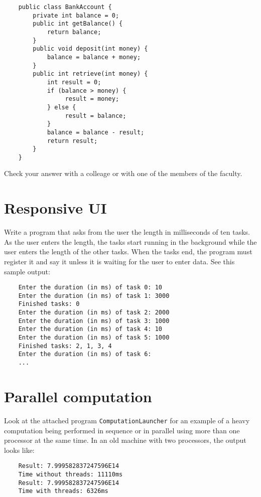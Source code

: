 \documentclass{article}
\begin{document}
\begin{verbatim}
    public class BankAccount {
        private int balance = 0;
        public int getBalance() {
            return balance;
        }
        public void deposit(int money) {
            balance = balance + money;
        }
        public int retrieve(int money) {
            int result = 0;
            if (balance > money) {
                 result = money;
            } else {
                 result = balance;
            }
            balance = balance - result;
            return result;
        }
    }
\end{verbatim}

Check your answer with a colleage or with one of the members of the
faculty. 

\section{Responsive UI}
\label{sec:responsive-ui}

Write a program that asks from the user the length in milliseconds of
ten tasks. As the user enters the length, the tasks start running in
the background while the user enters the length of the other
tasks. When the tasks end, the program must register it and say it
unless it is waiting for the user to enter data. See this sample
output: 

\begin{verbatim}
    Enter the duration (in ms) of task 0: 10
    Enter the duration (in ms) of task 1: 3000
    Finished tasks: 0
    Enter the duration (in ms) of task 2: 2000
    Enter the duration (in ms) of task 3: 1000
    Enter the duration (in ms) of task 4: 10
    Enter the duration (in ms) of task 5: 1000
    Finished tasks: 2, 1, 3, 4
    Enter the duration (in ms) of task 6: 
    ...
\end{verbatim}

\section{Parallel computation}
\label{sec:parallel-computation}

Look at the attached program \verb+ComputationLauncher+ for an example
of a heavy computation being performed in sequence or in parallel
using more than one processor at the same time. In an old machine with
two processors, the output looks like: 

\begin{verbatim}
    Result: 7.999582837247596E14
    Time without threads: 11110ms
    Result: 7.999582837247596E14
    Time with threads: 6326ms
\end{verbatim}
\end{document}
